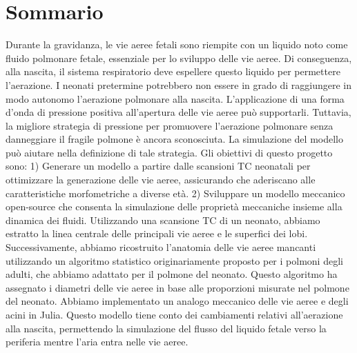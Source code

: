 \section*{Sommario}
Durante la gravidanza, le vie aeree fetali sono riempite con un
liquido noto come fluido polmonare fetale, essenziale per lo sviluppo
delle vie aeree. Di conseguenza, alla nascita, il sistema respiratorio
deve espellere questo liquido per permettere l'aerazione.  I neonati
pretermine potrebbero non essere in grado di raggiungere in modo
autonomo l’aerazione polmonare alla nascita. L'applicazione di una
forma d'onda di pressione positiva all'apertura delle vie aeree può
supportarli. Tuttavia, la migliore strategia di pressione per
promuovere l’aerazione polmonare senza danneggiare il fragile polmone
è ancora sconosciuta. La simulazione del modello può aiutare nella
definizione di tale strategia.
Gli obiettivi di questo progetto sono: 1) Generare un modello a
partire dalle scansioni TC neonatali per ottimizzare la generazione
delle vie aeree, assicurando che aderiscano alle caratteristiche
morfometriche a diverse età.  2) Sviluppare un modello meccanico
open-source che consenta la simulazione delle proprietà meccaniche
insieme alla dinamica dei fluidi.
Utilizzando una scansione TC di un neonato, abbiamo estratto la linea
centrale delle principali vie aeree e le superfici dei
lobi. Successivamente, abbiamo ricostruito l'anatomia delle vie aeree
mancanti utilizzando un algoritmo statistico originariamente proposto
per i polmoni degli adulti, che abbiamo adattato per il polmone del
neonato. Questo algoritmo ha assegnato i diametri delle vie aeree in
base alle proporzioni misurate nel polmone del neonato. Abbiamo
implementato un analogo meccanico delle vie aeree e degli acini in
Julia. Questo modello tiene conto dei cambiamenti relativi
all'aerazione alla nascita, permettendo la simulazione del flusso del
liquido fetale verso la periferia mentre l'aria entra nelle vie aeree.

